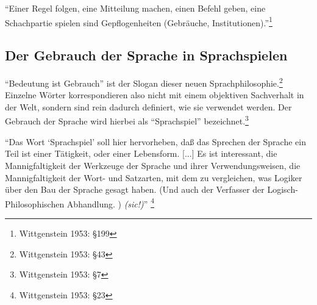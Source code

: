 \documentclass[10pt,a4paper]{article}
\begin{document}
\begin{displayquote}
\enquote{Einer Regel folgen, eine Mitteilung machen, einen Befehl geben, eine Schachpartie spielen sind Gepflogenheiten (Gebräuche, Institutionen).}\footnote{Wittgenstein 1953: §199}
\end{displayquote}


\subsection{Der Gebrauch der Sprache in Sprachspielen}
\enquote{Bedeutung ist Gebrauch} ist der Slogan dieser neuen Sprachphilosophie.\footnote{Wittgenstein 1953: §43} Einzelne Wörter korrespondieren also nicht mit einem objektiven Sachverhalt in der Welt, sondern sind rein dadurch definiert, wie sie verwendet werden. Der Gebrauch der Sprache wird hierbei als \enquote{Sprachspiel} bezeichnet.\footnote{Wittgenstein 1953: §7}

\begin{displayquote}
\enquote{Das Wort \enquote{Sprachspiel} soll hier hervorheben, daß das Sprechen
der Sprache ein Teil ist einer Tätigkeit, oder einer Lebensform. [...]
Es ist interessant, die Mannigfaltigkeit der Werkzeuge der Sprache
und ihrer Verwendungsweisen, die Mannigfaltigkeit der Wort- und
Satzarten, mit dem zu vergleichen, was Logiker über den Bau der
Sprache gesagt haben. (Und auch der Verfasser der Logisch-Philosophischen Abhandlung. ) \textit{(sic!)}} \footnote{Wittgenstein 1953: §23}
\end{displayquote}
\end{document}
